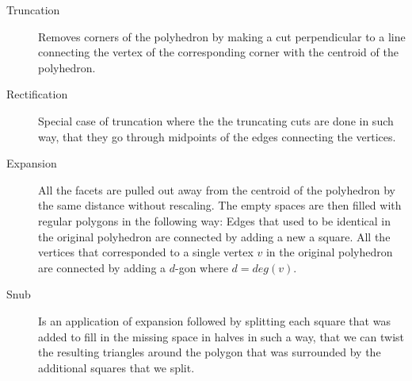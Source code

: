 \begin{description}
    \item[Truncation] Removes corners of the polyhedron by making a cut perpendicular to a line connecting the vertex of the corresponding corner with the centroid of the polyhedron.
    \item[Rectification] Special case of truncation where the the truncating cuts are done in such way, that they go through midpoints of the edges connecting the vertices. 
    \item[Expansion] All the facets are pulled out away from the centroid of the polyhedron by the same distance without rescaling. The empty spaces are then filled with regular polygons in the following way: Edges that used to be identical in the original polyhedron are connected by adding a new a square. All the vertices that corresponded to a single vertex $v$ in the original polyhedron are connected by adding a $d$-gon where $d=deg(v)$.   
    \item[Snub] Is an application of expansion followed by splitting each square that was added to fill in the missing space in halves in such a way, that we can twist the resulting triangles around the polygon that was surrounded by the additional squares that we split. 
\end{description}

